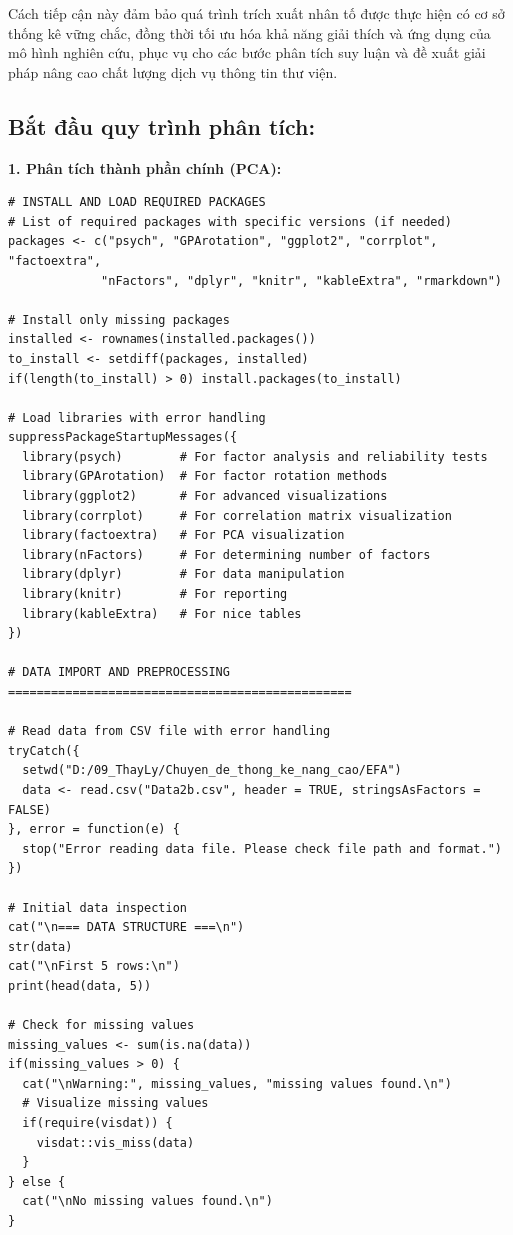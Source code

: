 Cách tiếp cận này đảm bảo quá trình trích xuất nhân tố được thực hiện có cơ sở thống kê vững chắc, đồng thời tối ưu hóa khả năng giải thích và ứng dụng của mô hình nghiên cứu, phục vụ cho các bước phân tích suy luận và đề xuất giải pháp nâng cao chất lượng dịch vụ thông tin thư viện.

\subsection*{Bắt đầu quy trình phân tích:}
\textbf{1. Phân tích thành phần chính (PCA):} 

\begin{lstlisting}[style=Rstyle, caption={Đọc dữ liệu vào để tiến hành phân tích dữ liệu}]
# INSTALL AND LOAD REQUIRED PACKAGES
# List of required packages with specific versions (if needed)
packages <- c("psych", "GPArotation", "ggplot2", "corrplot", "factoextra", 
             "nFactors", "dplyr", "knitr", "kableExtra", "rmarkdown")

# Install only missing packages
installed <- rownames(installed.packages())
to_install <- setdiff(packages, installed)
if(length(to_install) > 0) install.packages(to_install)

# Load libraries with error handling
suppressPackageStartupMessages({
  library(psych)        # For factor analysis and reliability tests
  library(GPArotation)  # For factor rotation methods
  library(ggplot2)      # For advanced visualizations
  library(corrplot)     # For correlation matrix visualization
  library(factoextra)   # For PCA visualization
  library(nFactors)     # For determining number of factors
  library(dplyr)        # For data manipulation
  library(knitr)        # For reporting
  library(kableExtra)   # For nice tables
})

# DATA IMPORT AND PREPROCESSING ================================================

# Read data from CSV file with error handling
tryCatch({
  setwd("D:/09_ThayLy/Chuyen_de_thong_ke_nang_cao/EFA")
  data <- read.csv("Data2b.csv", header = TRUE, stringsAsFactors = FALSE)
}, error = function(e) {
  stop("Error reading data file. Please check file path and format.")
})

# Initial data inspection
cat("\n=== DATA STRUCTURE ===\n")
str(data)
cat("\nFirst 5 rows:\n")
print(head(data, 5))

# Check for missing values
missing_values <- sum(is.na(data))
if(missing_values > 0) {
  cat("\nWarning:", missing_values, "missing values found.\n")
  # Visualize missing values
  if(require(visdat)) {
    visdat::vis_miss(data)
  }
} else {
  cat("\nNo missing values found.\n")
}


\end{lstlisting}

